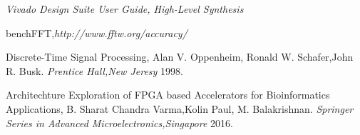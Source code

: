 \begin{thebibliography}{9}
 \label{Vivado}
\textit{Vivado Design Suite User Guide, High-Level Synthesis}

 \label{accuracy fftw3}
benchFFT,\textit{http://www.fftw.org/accuracy/}

 \label{accuracy fftw3}
Discrete-Time Signal Processing, Alan V. Oppenheim, Ronald W. Schafer,John R. Busk.
\textit{Prentice Hall,New Jeresy} 1998.

 \label{architechture}
Architechture Exploration of FPGA based Accelerators for Bioinformatics Applications, B. Sharat Chandra Varma,Kolin Paul, M. Balakrishnan.
\textit{Springer Series in Advanced Microelectronics,Singapore} 2016.
\end{thebibliography}



%


